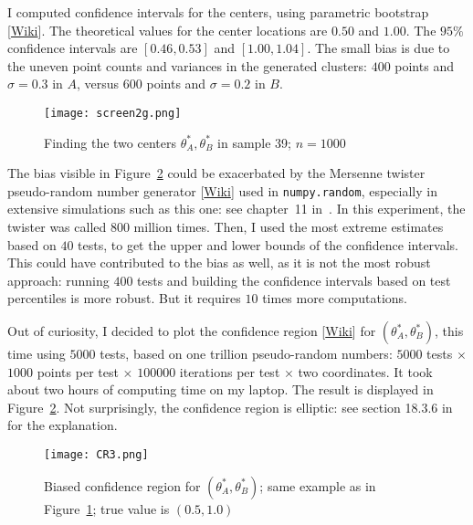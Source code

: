 \documentclass[oneside,10pt]{book}
\begin{document}
I computed confidence intervals for the centers, using \textcolor{index}{parametric bootstrap} [\href{https://en.wikipedia.org/wiki/Bootstrapping_(statistics)#Parametric_bootstrap}{Wiki}]. The theoretical values for the center
 locations are $0.50$ and $1.00$. The $95\%$ confidence intervals are $[0.46,0.53]$ and $[1.00, 1.04]$. The small bias is due to the uneven point counts and variances in the generated clusters: $400$ points and $\sigma=0.3$ in $A$, versus $600$ points and $\sigma=0.2$ in $B$. 

\begin{figure}%
\centering
\texttt{[image: screen2g.png]}   
\caption{Finding the two centers $\theta_A^*, \theta_B^*$ in sample 39; $n=1000$}
\label{fig:screen2}
\end{figure}

The bias visible in Figure~\ref{fig:cr} could be exacerbated by the
\textcolor{index}{Mersenne twister} pseudo-random number generator [\href{https://en.wikipedia.org/wiki/Mersenne_Twister}{Wiki}] used in \texttt{numpy.random}, especially in extensive simulations such as this one:
 see chapter~11 in~\cite{vgelsevier}. In this experiment, the twister was called $800$ million times.  Then, I used the most extreme estimates based on $40$ tests, to get the upper and lower bounds of the confidence intervals. This could have contributed to the bias as well, as it is not the most robust approach: running $400$ tests and building the confidence intervals based on test percentiles is more robust. But it requires $10$ times more computations.

Out of curiosity, I decided to plot the \textcolor{index}{confidence region} [\href{https://en.wikipedia.org/wiki/Confidence_region}{Wiki}] for $(\theta_A^*,\theta_B^*)$, this time using $\num{5000}$ tests, 
 based on one trillion \textcolor{index}{pseudo-random numbers}: $\num{5000}$ tests $\times$ $1000$ points per test $\times$ $\num{100000}$ iterations per test $\times$ two 
 coordinates. It took about two hours of computing time on my laptop. The result is displayed in Figure~\ref{fig:cr}. Not surprisingly, the confidence
 region is elliptic: see section 18.3.6 in~\cite{vgelsevier} for the explanation.

\begin{figure}[H]
\centering
\texttt{[image: CR3.png]}  
\caption{Biased confidence region for $(\theta_A^*,\theta_B^*)$;  same example as in Figure~\ref{fig:screen2}; true value is $(0.5,1.0)$}
\label{fig:cr}
\end{figure}
\end{document}
